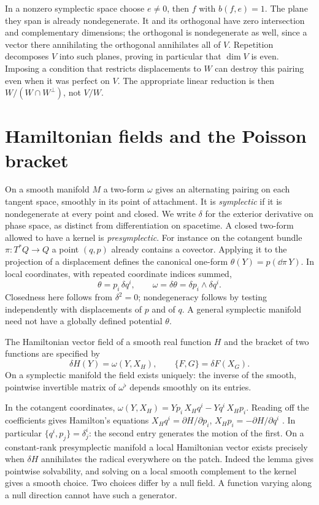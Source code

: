 In a nonzero symplectic space choose $e\ne0$, then $f$ with $b(f,e)=1$. The plane they span is already nondegenerate. It and its orthogonal have zero intersection and complementary dimensions; the orthogonal is nondegenerate as well, since a vector there annihilating the orthogonal annihilates all of $V$. Repetition decomposes $V$ into such planes, proving in particular that $\dim V$ is even. Imposing a condition that restricts displacements to $W$ can destroy this pairing even when it was perfect on $V$. The appropriate linear reduction is then $W/(W\cap W^\perp)$, not $V/W$.

\section{Hamiltonian fields and the Poisson bracket}
On a smooth manifold $M$ a two-form $\omega$ gives an alternating pairing on each tangent space, smoothly in its point of attachment. It is \emph{symplectic} if it is nondegenerate at every point and closed. We write $\delta$ for the exterior derivative on phase space, as distinct from differentiation on spacetime. A closed two-form allowed to have a kernel is \emph{presymplectic}. For instance on the cotangent bundle $\pi:T^*Q\to Q$ a point $(q,p)$ already contains a covector. Applying it to the projection of a displacement defines the canonical one-form $\theta(Y)=p(\dd\pi\,Y)$. In local coordinates, with repeated coordinate indices summed,
\[
 \theta=p_i\,\delta q^i,\qquad \omega=\delta\theta=\delta p_i\wedge\delta q^i .
\]
Closedness here follows from $\delta^2=0$; nondegeneracy follows by testing independently with displacements of $p$ and of $q$. A general symplectic manifold need not have a globally defined potential $\theta$.

\begin{definition}\label{f:hamiltonian-slots}
The Hamiltonian vector field of a smooth real function $H$ and the bracket of two functions are specified by
\begin{equation}
 \delta H(Y)=\omega(Y,X_H),\qquad \{F,G\}=\delta F(X_G).
 \label{f:poisson-convention}
\end{equation}
On a symplectic manifold the field exists uniquely: the inverse of the smooth, pointwise invertible matrix of $\omega^\flat$ depends smoothly on its entries.
\end{definition}
In the cotangent coordinates, $\omega(Y,X_H)=Yp_i\,X_H q^i-Yq^i\,X_H p_i$. Reading off the coefficients gives Hamilton's equations $X_H q^i=\partial H/\partial p_i$, $X_H p_i=-\partial H/\partial q^i$ \cite{Arnold}. In particular $\{q^i,p_j\}=\delta^i_j$: the second entry generates the motion of the first. On a constant-rank presymplectic manifold a local Hamiltonian vector exists precisely when $\delta H$ annihilates the radical everywhere on the patch. Indeed the lemma gives pointwise solvability, and solving on a local smooth complement to the kernel gives a smooth choice. Two choices differ by a null field. A function varying along a null direction cannot have such a generator.

